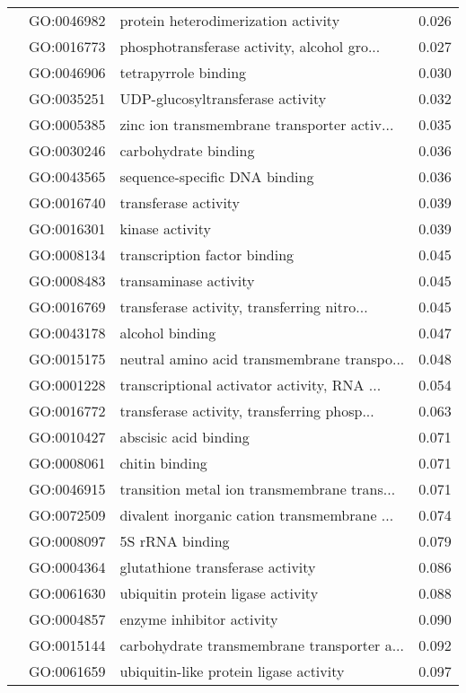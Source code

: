 \begin{longtable}{lllr}
   & GO:0046982 &          protein heterodimerization activity &         0.026 \\
   & GO:0016773 &  phosphotransferase activity, alcohol gro... &         0.027 \\
   & GO:0046906 &                         tetrapyrrole binding &         0.030 \\
   & GO:0035251 &             UDP-glucosyltransferase activity &         0.032 \\
   & GO:0005385 &  zinc ion transmembrane transporter activ... &         0.035 \\
   & GO:0030246 &                         carbohydrate binding &         0.036 \\
   & GO:0043565 &                sequence-specific DNA binding &         0.036 \\
   & GO:0016740 &                         transferase activity &         0.039 \\
   & GO:0016301 &                              kinase activity &         0.039 \\
   & GO:0008134 &                 transcription factor binding &         0.045 \\
   & GO:0008483 &                        transaminase activity &         0.045 \\
   & GO:0016769 &  transferase activity, transferring nitro... &         0.045 \\
   & GO:0043178 &                              alcohol binding &         0.047 \\
   & GO:0015175 &  neutral amino acid transmembrane transpo... &         0.048 \\
   & GO:0001228 &  transcriptional activator activity, RNA ... &         0.054 \\
   & GO:0016772 &  transferase activity, transferring phosp... &         0.063 \\
   & GO:0010427 &                        abscisic acid binding &         0.071 \\
   & GO:0008061 &                               chitin binding &         0.071 \\
   & GO:0046915 &  transition metal ion transmembrane trans... &         0.071 \\
   & GO:0072509 &  divalent inorganic cation transmembrane ... &         0.074 \\
   & GO:0008097 &                              5S rRNA binding &         0.079 \\
   & GO:0004364 &             glutathione transferase activity &         0.086 \\
   & GO:0061630 &            ubiquitin protein ligase activity &         0.088 \\
   & GO:0004857 &                    enzyme inhibitor activity &         0.090 \\
   & GO:0015144 &  carbohydrate transmembrane transporter a... &         0.092 \\
   & GO:0061659 &       ubiquitin-like protein ligase activity &         0.097 \\
\end{longtable}
